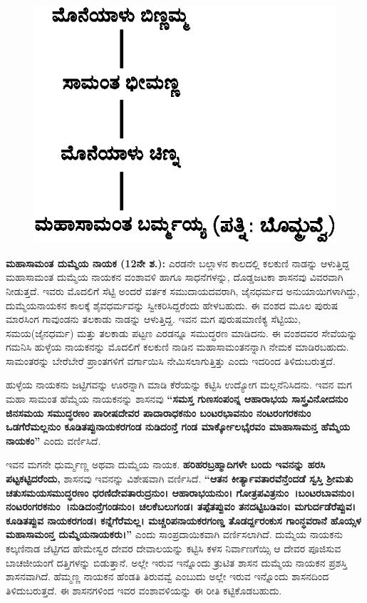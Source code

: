 \newpage

\begin{figure}[H]
\includegraphics[scale=1.22]{images/chap3/chap3fig5.jpeg}
\end{figure}

\textbf{ಮಹಾಸಾಮಂತ ದುಮ್ಮೆಯ ನಾಯಕ (12ನೇ ಶ.):} ಎರಡನೇ ಬಲ್ಲಾಳನ ಕಾಲದಲ್ಲಿ ಕಲಕುಣಿ ನಾಡನ್ನು ಆಳುತ್ತಿದ್ದ ಮಹಾಸಾಮಂತ ದುಮ್ಮೆಯ ನಾಯಕನ ವಂಶಾವಳಿ ಹಾಗೂ ಸಾಧನೆಗಳನ್ನು, ದೊಡ್ಡಜಟಕಾ ಶಾಸನವು ವಿವರವಾಗಿ ನೀಡುತ್ತದೆ. ಇವರು ಮೊದಲಿಗೆ ಸೆಟ್ಟಿ ಅಂದರೆ ವರ್ತಕ ಸಮುದಾಯದವರಾಗಿ, ಜೈನಧರ್ಮದ ಅನುಯಾಯಿಗಳಾಗಿದ್ದು, ದುಮ್ಮೆಯ\-ನಾಯಕನ ಕಾಲಕ್ಕೆ ಶೈವಧರ್ಮವನ್ನು ಸ್ವೀಕರಿಸಿದ್ದರೆಂದು ಹೇಳಬಹುದು. ಈ ವಂಶದ ಮೂಲ ಪುರುಷ ಮಾರಸಿಂಗ ಗಾವುಂಡನು ತಲಕಾಡು ನಾಡನ್ನು ಆಳುತ್ತಿದ್ದ. ಇವನ ಮಗ ಪುರುಷಮಾಣಿಕ್ಯ ಸೆಟ್ಟಿಯು, ಸಮಯ(ಜೈನಧರ್ಮ) ಮತ್ತು ತಲಕಾಡು ಪಟ್ಟಣ ಎರಡನ್ನೂ ಸಮುದ್ಧರಣ ಮಾಡಿದನು. ಈ ವಂಶದವರ ಸೇವೆಯನ್ನು ಗಮನಿಸಿ ಹುಳ್ಳೆಯ ನಾಯಕನನ್ನು ಮೊದಲಿಗೆ ಕಲಕುಣಿ ನಾಡಿನ ಮಹಾಸಾಮಂತನನ್ನಾಗಿ ನೇಮಕ ಮಾಡಿರಬಹುದು. ಸಾಮಂತರನ್ನು ಬೇರೆಬೇರೆ ಪ್ರಾಂತಗಳಿಗೆ ವರ್ಗಾಯಿಸಿ ನೇಮಿಸಲಾಗುತ್ತಿತ್ತು ಎಂದು ಇದರಿಂದ ತಿಳಿದುಬರುತ್ತದೆ.

ಹುಳ್ಳೆಯ ನಾಯಕನು ಜಟ್ಟಿಗವನ್ನು ಊರನ್ನಾಗಿ ಮಾಡಿ ಕೆರೆಯನ್ನು ಕಟ್ಟಿಸಿ ಉದ್ಯೋಗ ಮಲ್ಲನೆನಿಸಿದನು. ಇವನ ಮಗ ಮಹಾ ಸಾಮಂತ ಹೆಮ್ಮೆಯ ನಾಯಕನನ್ನು ಶಾಸನವು \textbf{“ಸಮಸ್ತ ಗುಣಸಂಪಂನ್ನ ಆಹಾರಾಭಯ ಸಾಸ್ತ್ರವಿನೋದನುಂ ಜಿನಸಮಯ ಸಮುದ್ಧರಣಂ ಪಾರೀಷದೇವರ ಪಾದಾರಾಧಕನುಂ ಬಂಟರಭಾವನುಂ ನಂಟರಂಗರಕನುಂ ಒಡಗೆರೆಮಲ್ಲನುಂ ಕೂಡಿತಪ್ಪುನಾಯಕರಗಂಡ ನುಡಿದಂನ್ತೆ ಗಂಡ ಮಾರ್ಕ್ಕೋಲಭೈರವಂ ಮಾಹಾಸಾಮನ್ತ ಹೆಮ್ಮೆಯ ನಾಯಕಂ”} ಎಂದು ವರ್ಣಿಸಿದೆ.

ಇವನ ಮಗನೇ ಧುರ್ಮ್ಮಣ್ಣ ಅಥವಾ ದುಮ್ಮೆಯ ನಾಯಕ. \textbf{ಹರಿಹರಬ್ರಹ್ಮಾದಿಗಳೇ ಬಂದು ಇವನನ್ನು ಹರಸಿ ಪಟ್ಟಕಟ್ಟಿದ\-ರೆಂದು,} ಶಾಸನವು ಇವನನ್ನು ವಿಶೇಷವಾಗಿ ವರ್ಣಿಸಿದೆ.\textbf{ “ಆತನ ಕೀರ್ತ್ಯಾವತಾರವೆನ್ತೆಂದಡೆ ಸ್ವಸ್ತಿ ಶ‍್ರೀಮತು\general{\break } ಚತುಸಮಯಸಮುದ್ಧರಣಂ ಧರಣಿದೇವತಾರುದ್ರನುಂ। ಆಹಾರಾಭಯನುಂ। ಗೋತ್ರಪವಿತ್ರನುಂ~।ಬಂಟರಬಾವನುಂ।\general{\break } ನಂಟರಂಗರಕನುಂ~।ನುಡಿದಂನ್ತೆಗಂಡನುಂ। ಚಲಕೆಬಲುಗಂಡ। ತಪ್ಪೆತಪ್ಪುವಂ ತನದಟ್ಟಿಬಡಿವಂ। ಮಗುರ್ದಡೆರೆಪ್ಪುವ। ಕೂಡಿತಪ್ಪುವ ನಾಯಕರಗಂಡ। ಕನ್ನೆಗೆರೆಮಲ್ಲ। ಮಚ್ಚರಿಪನಾಯಕರಗಂಣ್ಡ ತೊಡರ್ದ್ದರಂಕುಸ ಗಾಂನ್ಧವರಾನೆ ಹೊಯ್ಸಳ ಮಹಾಸಾಮಂನ್ತ\general{\break } ದುಮ್ಮೆಯನಾಯಕರು।”} ಎಂದು ಸಾಂಪ್ರದಾಯಿಕವಾಗಿ ವರ್ಣಿಸಲಾಗಿದೆ. ದುಮ್ಮೆಯ ನಾಯಕನು ಕಲ್ಕಣಿನಾಡ ಜೆಟ್ಟಿಗದ ಹೇಮೇಸ್ವರ ದೇವರ ದೇವಾಲಯನ್ನು ಕಟ್ಟಿಸಿ ಕಳಸ ನಿರ್ವಾಣಗೆಯ್ಸಿ ಆ ದೇವರ ಪೂಜಿಸುವ ಬಾಚಜೀಯಂಗೆ ದತ್ತಿಗಳನ್ನು ಬಿಡುತ್ತಾನೆ. ಅಲ್ಲೇ ಇರುವ ಇನ್ನೊಂದು ತ್ರುಟಿತ ಶಾಸನ ದುಮ್ಮೆಯ ನಾಯಕನ ಪ್ರಶಸ್ತಿ ಶಾಸನವಾಗಿದೆ. ಹೆಮ್ಮಣ್ಣ ನಾಯಕನ ಹೆಂಡತಿ ತಿರುವವ್ವೆ ಎಂಬುದು ಅಲ್ಲೇ ಇರುವ ಇನ್ನೊಂದು ಶಾಸನದಿಂದ ತಿಳಿದುಬರುತ್ತದೆ. ಈ ಶಾಸನಗಳಿಂದ ಇವರ ವಂಶಾವಳಿಯನ್ನು ಈ ರೀತಿ ಕಟ್ಟಿಕೊಡಬಹುದು.

